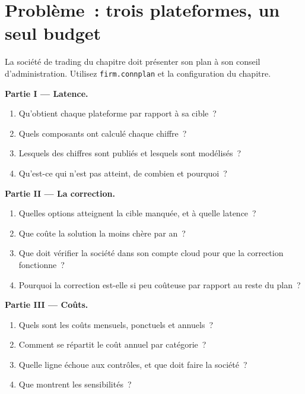 \section{Problème~: trois plateformes, un seul budget}

\begin{problem}\label{pb:nw:build-a-connectivity-plan:1}
La société de trading du chapitre doit présenter son plan à son conseil d'administration. Utilisez \texttt{firm.connplan} et la configuration du chapitre.

\medskip\noindent\textbf{Partie I --- Latence.}
\begin{enumerate}
\item Qu'obtient chaque plateforme par rapport à sa cible~?
\item Quels composants ont calculé chaque chiffre~?
\item Lesquels des chiffres sont publiés et lesquels sont modélisés~?
\item Qu'est-ce qui n'est pas atteint, de combien et pourquoi~?
\end{enumerate}

\medskip\noindent\textbf{Partie II --- La correction.}
\begin{enumerate}[resume]
\item Quelles options atteignent la cible manquée, et à quelle latence~?
\item Que coûte la solution la moins chère par an~?
\item Que doit vérifier la société dans son compte cloud pour que la correction fonctionne~?
\item Pourquoi la correction est-elle si peu coûteuse par rapport au reste du plan~?
\end{enumerate}

\medskip\noindent\textbf{Partie III --- Coûts.}
\begin{enumerate}[resume]
\item Quels sont les coûts mensuels, ponctuels et annuels~?
\item Comment se répartit le coût annuel par catégorie~?
\item Quelle ligne échoue aux contrôles, et que doit faire la société~?
\item Que montrent les sensibilités~?
\end{enumerate}


\end{problem}
